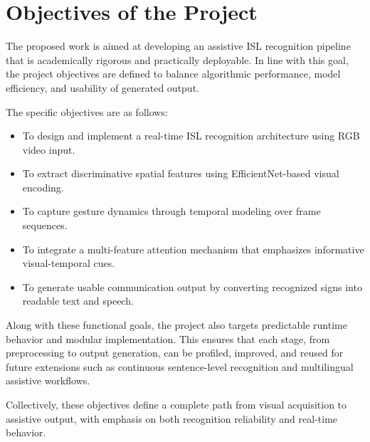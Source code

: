 \section{Objectives of the Project}
The proposed work is aimed at developing an assistive ISL recognition pipeline that is academically rigorous and practically deployable. In line with this goal, the project objectives are defined to balance algorithmic performance, model efficiency, and usability of generated output.

The specific objectives are as follows:
\begin{itemize}[leftmargin=1.5em]
\item To design and implement a real-time ISL recognition architecture using RGB video input.
\item To extract discriminative spatial features using EfficientNet-based visual encoding.
\item To capture gesture dynamics through temporal modeling over frame sequences.
\item To integrate a multi-feature attention mechanism that emphasizes informative visual-temporal cues.
\item To generate usable communication output by converting recognized signs into readable text and speech.
\end{itemize}

Along with these functional goals, the project also targets predictable runtime behavior and modular implementation. This ensures that each stage, from preprocessing to output generation, can be profiled, improved, and reused for future extensions such as continuous sentence-level recognition and multilingual assistive workflows.

Collectively, these objectives define a complete path from visual acquisition to assistive output, with emphasis on both recognition reliability and real-time behavior.
